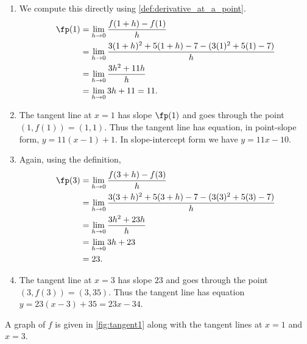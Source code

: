 {	\begin{enumerate}
	\item We compute this directly using \autoref{def:derivative_at_a_point}.
		\begin{align*}
			\fp(1) &= \lim_{h\to 0} \frac{f(1+h)-f(1)}{h} \\
				   &= \lim_{h\to 0} \frac{3(1+h)^2+5(1+h)-7 - (3(1)^2+5(1)-7)}{h}\\
				   &= \lim_{h\to 0} \frac{3h^2+11h}{h}\\
				   &= \lim_{h\to 0} 3h+11=11.%
		\end{align*}
	\item The tangent line at $x=1$ has slope $\fp(1)$ and goes through the point $(1,f(1)) = (1,1)$. Thus the tangent line has equation, in point-slope form, $y = 11(x-1) + 1$. In slope-intercept form we have $y = 11x-10$.
	\item Again, using the definition,
		\begin{align*}
			\fp(3) &= \lim_{h\to 0} \frac{f(3+h)-f(3)}{h} \\
				   &= \lim_{h\to 0} \frac{3(3+h)^2+5(3+h)-7 - (3(3)^2+5(3)-7)}{h} \\
				   &= \lim_{h\to 0} \frac{3h^2+23h}{h}\\
				   &= \lim_{h\to 0} 3h+23 \\
				   &= 23.
		\end{align*}
	\item The tangent line at $x=3$ has slope $23$ and goes through the point $(3,f(3)) = (3,35)$. Thus the tangent line has equation $y=23(x-3)+35 = 23x-34$.
	\end{enumerate}


A graph of $f$ is given in \autoref{fig:tangent1} along with the tangent lines at $x=1$ and $x=3$.}

